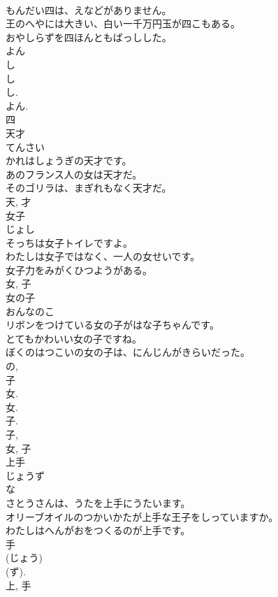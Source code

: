 \documentclass[8pt]{extreport}
\begin{document}
\begin{CJK}{UTF8}{min}
\\	もんだい四は、えなどがありません。	
\\	王のへやには大きい、白い一千万円玉が四こもある。	
\\	おやしらずを四ほんともばっしした。	
\\	よん 
\\	し 
\\	し 
\\	し. 
\\	よん. 
\\	四	
\\	天才	
\\	てんさい	
\\	かれはしょうぎの天才です。	
\\	あのフランス人の女は天才だ。	
\\	そのゴリラは、まぎれもなく天才だ。	
\\	天, 才	
\\	女子	
\\	じょし	
\\	そっちは女子トイレですよ。	
\\	わたしは女子ではなく、一人の女せいです。	
\\	女子力をみがくひつようがある。	
\\	女, 子	
\\	女の子	
\\	おんなのこ	
\\	リボンをつけている女の子がはな子ちゃんです。	
\\	とてもかわいい女の子ですね。	
\\	ぼくのはつこいの女の子は、にんじんがきらいだった。	
\\	の, 
\\	子 
\\	女. 
\\	女. 
\\	子. 
\\	子, 
\\	女, 子	
\\	上手	
\\	じょうず	
\\	な 
\\	さとうさんは、うたを上手にうたいます。	
\\	オリーブオイルのつかいかたが上手な王子をしっていますか。	
\\	わたしはへんがおをつくるのが上手です。	
\\	手 
\\	(じょう) 
\\	(ず). 
\\	上, 手	

\end{CJK}
\end{document}
